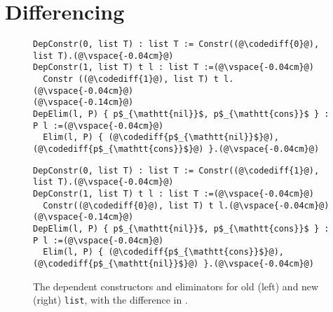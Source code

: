 \section{Differencing}


\begin{figure*}
\begin{minipage}{0.48\textwidth}
\begin{lstlisting}
DepConstr(0, list T) : list T := Constr((@\codediff{0}@), list T).(@\vspace{-0.04cm}@)
DepConstr(1, list T) t l : list T :=(@\vspace{-0.04cm}@)
  Constr ((@\codediff{1}@), list T) t l.(@\vspace{-0.04cm}@)
(@\vspace{-0.14cm}@)
DepElim(l, P) { p$_{\mathtt{nil}}$, p$_{\mathtt{cons}}$ } : P l :=(@\vspace{-0.04cm}@)
  Elim(l, P) { (@\codediff{p$_{\mathtt{nil}}$}@), (@\codediff{p$_{\mathtt{cons}}$}@) }.(@\vspace{-0.04cm}@)
\end{lstlisting}
\end{minipage}
\hfill
\begin{minipage}{0.48\textwidth}
\begin{lstlisting}
DepConstr(0, list T) : list T := Constr((@\codediff{1}@), list T).(@\vspace{-0.04cm}@)
DepConstr(1, list T) t l : list T :=(@\vspace{-0.04cm}@)
  Constr((@\codediff{0}@), list T) t l.(@\vspace{-0.04cm}@)
(@\vspace{-0.14cm}@)
DepElim(l, P) { p$_{\mathtt{nil}}$, p$_{\mathtt{cons}}$ } : P l :=(@\vspace{-0.04cm}@)
  Elim(l, P) { (@\codediff{p$_{\mathtt{cons}}$}@), (@\codediff{p$_{\mathtt{nil}}$}@) }.(@\vspace{-0.04cm}@)
\end{lstlisting}
\end{minipage}
\vspace{-0.3cm}
\caption{The dependent constructors and eliminators for old (left) and new (right) \lstinline{list}, with the difference in .}
\vspace{-0.1cm}
\label{fig:listconfig}
\end{figure*}

